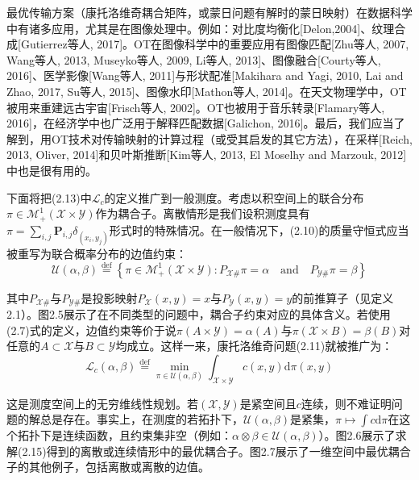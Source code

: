 \documentclass[cn,10pt,math=newtx,citestyle=gb7714-2015,bibstyle=gb7714-2015]{elegantbook}
\begin{document}
\begin{postulate}[最优分配与最优耦合的应用]

最优传输方案（康托洛维奇耦合矩阵，或蒙日问题有解时的蒙日映射）在数据科学中有诸多应用，尤其是在图像处理中。例如：对比度均衡化[Delon,2004]、纹理合成[Gutierrez等人, 2017]。OT在图像科学中的重要应用有图像匹配[Zhu等人, 2007, Wang等人, 2013, Museyko等人, 2009, Li等人, 2013]、图像融合[Courty等人, 2016]、医学影像[Wang等人, 2011]与形状配准[Makihara and Yagi, 2010, Lai and Zhao, 2017, Su等人, 2015]、图像水印[Mathon等人, 2014]。在天文物理学中，OT被用来重建远古宇宙[Frisch等人, 2002]。OT也被用于音乐转录[Flamary等人, 2016]，在经济学中也广泛用于解释匹配数据[Galichon, 2016]。最后，我们应当了解到，用OT技术对传输映射的计算过程（或受其启发的其它方法），在采样[Reich, 2013, Oliver, 2014]和贝叶斯推断[Kim等人, 2013, El Moselhy and Marzouk, 2012]中也是很有用的。

\end{postulate}

\begin{postulate}[一般测度的康托洛维奇问题]

下面将把(2.13)中$\mathcal{L}_c$的定义推广到一般测度。考虑以积空间上的联合分布$\pi\in\mathcal{M}_+^1(\mathcal{X}\times \mathcal{Y})$作为耦合子。离散情形是我们设积测度具有$\pi=\sum_{i,j}\mathbf{P}_{i,j}\delta_{(x_i,y_j)}$形式时的特殊情况。在一般情况下，(2.10)的质量守恒式应当被重写为联合概率分布的边值约束：
\begin{equation}
    \label{2.14}
    \mathcal{U}(\alpha,\beta)\overset{\text{def}}{=}\left\{ \pi\in\mathcal{M}_+^1(\mathcal{X}\times \mathcal{Y}):P_{\mathcal{X}\#}\pi=\alpha\quad \text{and} \quad P_{\mathcal{Y}\#}\pi=\beta \right\}
\end{equation}

其中$P_{\mathcal{X}\#}$与$P_{\mathcal{Y}\#}$是投影映射$P_{\mathcal{X}}(x,y)=x$与$P_{\mathcal{Y}}(x,y)=y$的前推算子（见定义2.1）。图2.5展示了在不同类型的问题中，耦合子约束对应的具体含义。若使用(2.7)式的定义，边值约束等价于说$\pi(A\times \mathcal{Y})=\alpha(A)$与$\pi(\mathcal{X} \times B)=\beta(B)$对任意的$A\subset \mathcal{X}$与$B\subset\mathcal{Y}$均成立。这样一来，康托洛维奇问题(2.11)就被推广为：
\begin{equation}
    \label{2.15}
    \mathcal{L}_c(\alpha,\beta)\overset{\text{def}}{=}\min\limits_{\pi\in\mathcal{U}(\alpha,\beta)}\int_{\mathcal{X}\times \mathcal{Y}}c(x,y)\text{d}\pi(x,y)
\end{equation}

这是测度空间上的无穷维线性规划。若$(\mathcal{X,Y})$是紧空间且$c$连续，则不难证明问题的解总是存在。事实上，在测度的若拓扑下，$\mathcal{U}(\alpha,\beta)$是紧集，$\pi\mapsto \int c\text{d}\pi$在这个拓扑下是连续函数，且约束集非空（例如：$\alpha\otimes\beta\in\mathcal{U}(\alpha,\beta)$）。图2.6展示了求解(2.15)得到的离散或连续情形中的最优耦合子。图2.7展示了一维空间中最优耦合子的其他例子，包括离散或离散的边值。

\end{postulate}
\end{document}
